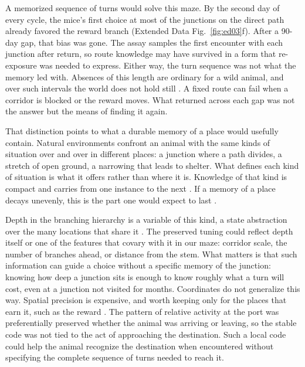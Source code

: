 \documentclass[fleqn,10pt]{wlscirep}
\begin{document}
A memorized sequence of turns would solve this maze. By the second day of every cycle, the mice’s first choice at most of the junctions on the direct path already favored the reward branch (Extended Data Fig.~\ref{fig:ed03}f). After a 90-day gap, that bias was gone. The assay samples the first encounter with each junction after return, so route knowledge may have survived in a form that re-exposure was needed to express. Either way, the turn sequence was not what the memory led with. Absences of this length are ordinary for a wild animal, and over such intervals the world does not hold still \cite{dingle_migration_2014, geiser_seasonal_2020}. A fixed route can fail when a corridor is blocked or the reward moves. What returned across each gap was not the answer but the means of finding it again.

That distinction points to what a durable memory of a place would usefully contain. Natural environments confront an animal with the same kinds of situation over and over in different places: a junction where a path divides, a stretch of open ground, a narrowing that leads to shelter. What defines each kind of situation is what it offers rather than where it is. Knowledge of that kind is compact and carries from one instance to the next \cite{singer_experience-dependent_2010, behrens_what_2018, whittington_tolman-eichenbaum_2020}. If a memory of a place decays unevenly, this is the part one would expect to last \cite{richards_persistence_2017}.

Depth in the branching hierarchy is a variable of this kind, a state abstraction over the many locations that share it \cite{mckenzie_hippocampal_2014}. The preserved tuning could reflect depth itself or one of the features that covary with it in our maze: corridor scale, the number of branches ahead, or distance from the stem. What matters is that such information can guide a choice without a specific memory of the junction: knowing how deep a junction sits is enough to know roughly what a turn will cost, even at a junction not visited for months. Coordinates do not generalize this way. Spatial precision is expensive, and worth keeping only for the places that earn it, such as the reward \cite{sato_distinct_2020, grosmark_reactivation_2021, pettit_fos_2022}. The pattern of relative activity at the port was preferentially preserved whether the animal was arriving or leaving, so the stable code was not tied to the act of approaching the destination. Such a local code could help the animal recognize the destination when encountered without specifying the complete sequence of turns needed to reach it.
\end{document}
